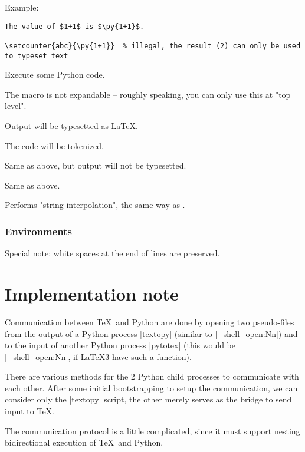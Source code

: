 Example:
\begin{verbatim}
The value of $1+1$ is $\py{1+1}$.

\setcounter{abc}{\py{1+1}}  % illegal, the result (2) can only be used to typeset text
\end{verbatim}

\DescribeMacro{\pyc}

Execute some Python code.

The macro is not expandable -- roughly speaking, you can only use this at "top level".

Output will be typesetted as \LaTeX.

The code will be tokenized.

\DescribeMacro{\pycq}

Same as above, but output will not be typesetted.

\DescribeMacro{\pyfile}
\DescribeMacro{\pyfileq}

Same as above.

\DescribeMacro{\pys}

Performs "string interpolation", the same way as .

\subsubsection{Environments}


Special note: white spaces at the end of lines are preserved.



\section{Implementation note}

Communication between \TeX\ and Python are done by opening two pseudo-files from the output of a Python process |textopy|
(similar to |\ior_shell_open:Nn|)
and to the input of another Python process |pytotex| (this would be |\iow_shell_open:Nn|, if \LaTeX3 have such a function).

There are various methods for the 2 Python child processes to communicate with each other.
After some initial bootstrapping to setup the communication, we can consider only the |textopy| script, the other
merely serves as the bridge to send input to \TeX.

The communication protocol is a little complicated, since it must support nesting bidirectional execution of \TeX\ and Python.

